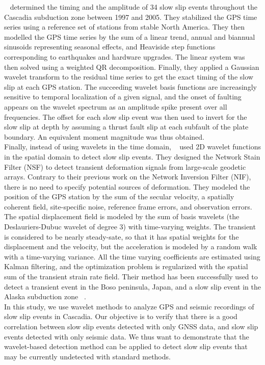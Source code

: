 \documentclass[draft]{agujournal2018}
\begin{document}
~\citet{SZE_2008} determined the timing and the amplitude of 34 slow slip events throughout the Cascadia subduction zone between 1997 and 2005. They stabilized the GPS time series using a reference set of stations from stable North America. They then modelled the GPS time series by the sum of a linear trend, annual and biannual sinusoids representing seasonal effects, and Heaviside step functions corresponding to earthquakes and hardware upgrades. The linear system was then solved using a weighted QR decomposition. Finally, they applied a Gaussian wavelet transform to the residual time series to get the exact timing of the slow slip at each GPS station. The succeeding wavelet basis functions are increasingly sensitive to temporal localization of a given signal, and the onset of faulting appears on the wavelet spectrum as an amplitude spike present over all frequencies. The offset for each slow slip event was then used to invert for the slow slip at depth by assuming a thrust fault slip at each subfault of the plate boundary. An equivalent moment magnitude was thus obtained. \\

Finally, instead of using wavelets in the time domain, ~\citet{OHT_2010} used 2D wavelet functions in the spatial domain to detect slow slip events. They designed the Network Stain Filter (NSF) to detect transient deformation signals from large-scale geodetic arrays. Contrary to their previous work on the Network Inversion Filter (NIF), there is no need to specify potential sources of deformation. They modeled the position of the GPS station by the sum of the secular velocity, a spatially coherent field, site-specific noise, reference frame errors, and observation errors. The spatial displacement field is modeled by the sum of basis wavelets (the Deslauriers-Dubuc wavelet of degree 3) with time-varying weights. The transient is considered to be nearly steady-sate, so that it has spatial weights for the displacement and the velocity, but the acceleration is modeled by a random walk with a time-varying variance. All the time varying coefficients are estimated using Kalman filtering, and the optimization problem is regularized with the spatial sum of the transient strain rate field. Their method has been successfully used to detect a transient event in the Boso peninsula, Japan, and a slow slip event in the Alaska subduction zone ~\citep{WEI_2012}. \\

In this study, we use wavelet methods to analyze GPS and seismic recordings of slow slip events in Cascadia. Our objective is to verify that there is a good correlation between slow slip events detected with only GNSS data, and slow slip events detected with only seismic data. We thus want to demonstrate that the wavelet-based detection method can be applied to detect slow slip events that may be currently undetected with standard methods. \\
\end{document}
